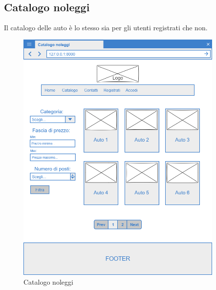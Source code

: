 \documentclass[12pt,a4paperS]{report}
\begin{document}
\begin{normalsize}
			\subsection{Catalogo noleggi}
				Il catalogo delle auto è lo stesso sia per gli utenti registrati che non.
				\newline
				\begin{figure}[H]
					\centering
					\includegraphics[width=0.91\textwidth, height=0.91\textheight, keepaspectratio]{Mockup/Catalogo.png}
					\caption{Catalogo noleggi}
				\end{figure}
			

\end{normalsize}
\end{document}
